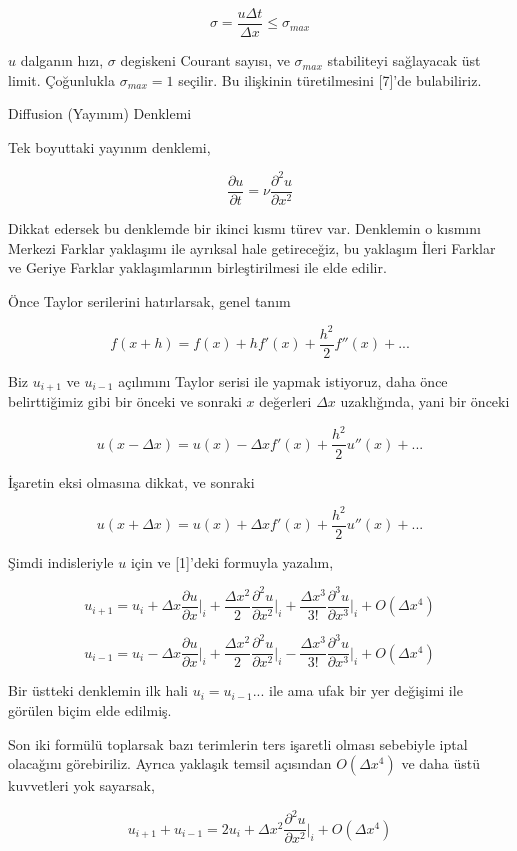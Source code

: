 \documentclass[12pt,fleqn]{article}\usepackage{../../common}
\begin{document}
$$
\sigma = \frac{u \Delta t}{\Delta x} \le \sigma_{max}
$$

$u$ dalganın hızı, $\sigma$ degiskeni Courant sayısı, ve $\sigma_{max}$
stabiliteyi sağlayacak üst limit. Çoğunlukla $\sigma_{max} = 1$ seçilir. Bu
ilişkinin türetilmesini [7]'de bulabiliriz.

Diffusion (Yayınım) Denklemi

Tek boyuttaki yayınım denklemi,

$$
\frac{\partial u}{\partial t} = \nu \frac{\partial^2 u}{\partial x^2}
$$

Dikkat edersek bu denklemde bir ikinci kısmı türev var. Denklemin o
kısmını Merkezi Farklar yaklaşımı ile ayrıksal hale getireceğiz, bu
yaklaşım İleri Farklar ve Geriye Farklar yaklaşımlarının birleştirilmesi ile
elde edilir.

Önce Taylor serilerini hatırlarsak, genel tanım

$$
f(x+h) = f(x) + h f'(x) + \frac{h^2}{2} f''(x) + ...
$$

Biz $u_{i+1}$ ve $u_{i-1}$ açılımını Taylor serisi ile yapmak istiyoruz, daha
önce belirttiğimiz gibi bir önceki ve sonraki $x$ değerleri $\Delta x$
uzaklığında, yani bir önceki

$$
u(x-\Delta x) = u(x) - \Delta x f'(x) + \frac{h^2}{2} u''(x) + ...
$$

İşaretin eksi olmasına dikkat, ve sonraki 

$$
u(x+\Delta x) = u(x) + \Delta x f'(x) + \frac{h^2}{2} u''(x) + ...
$$

Şimdi indisleriyle $u$ için ve [1]'deki formuyla yazalım,

$$
u_{i+1} = u_i + \Delta x \frac{\partial u}{\partial x}\bigg|_i +
\frac{\Delta x^2}{2} \frac{\partial ^2 u}{\partial x^2}\bigg|_i +
\frac{\Delta x^3}{3!} \frac{\partial ^3 u}{\partial x^3}\bigg|_i +
O(\Delta x^4)
$$

$$
u_{i-1} = u_i - \Delta x \frac{\partial u}{\partial x}\bigg|_i +
\frac{\Delta x^2}{2} \frac{\partial ^2 u}{\partial x^2}\bigg|_i -
\frac{\Delta x^3}{3!} \frac{\partial ^3 u}{\partial x^3}\bigg|_i +
O(\Delta x^4)
$$

Bir üstteki denklemin ilk hali $u_i = u_{i-1} ... $ ile ama ufak bir yer
değişimi ile görülen biçim elde edilmiş. 

Son iki formülü toplarsak bazı terimlerin ters işaretli olması sebebiyle iptal
olacağını görebiriliz. Ayrıca yaklaşık temsil açısından $O(\Delta x^4)$ ve daha
üstü kuvvetleri yok sayarsak, 

$$
u_{i+1} + u_{i-1} =
2u_i+\Delta x^2 \frac{\partial ^2 u}{\partial x^2}\bigg|_i +
O(\Delta x^4)
$$
\end{document}
